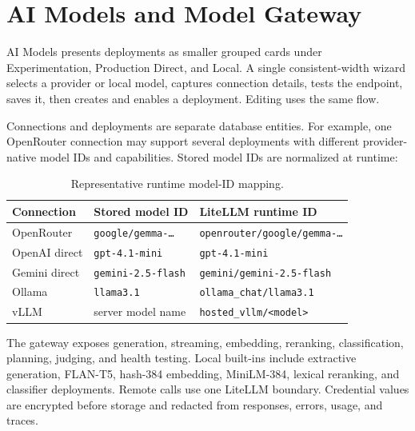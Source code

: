 
\section{AI Models and Model Gateway}

AI Models presents deployments as smaller grouped cards under Experimentation,
Production Direct, and Local. A single consistent-width wizard selects a
provider or local model, captures connection details, tests the endpoint, saves
it, then creates and enables a deployment. Editing uses the same flow.

Connections and deployments are separate database entities. For example, one
OpenRouter connection may support several deployments with different
provider-native model IDs and capabilities. Stored model IDs are normalized at
runtime:

\begin{table}[H]
  \centering
  \caption{Representative runtime model-ID mapping.}
  \label{tab:model-id-mapping}
  \begin{tabularx}{\textwidth}{p{}p{}X}
    \toprule
    Connection & Stored model ID & LiteLLM runtime ID\\
    \midrule
    OpenRouter & \texttt{google/gemma-\ldots} & \texttt{openrouter/google/gemma-\ldots}\\
    OpenAI direct & \texttt{gpt-4.1-mini} & \texttt{gpt-4.1-mini}\\
    Gemini direct & \texttt{gemini-2.5-flash} & \texttt{gemini/gemini-2.5-flash}\\
    Ollama & \texttt{llama3.1} & \texttt{ollama\_chat/llama3.1}\\
    vLLM & server model name & \texttt{hosted\_vllm/<model>}\\
    \bottomrule
  \end{tabularx}
\end{table}

The gateway exposes generation, streaming, embedding, reranking,
classification, planning, judging, and health testing. Local built-ins include
extractive generation, FLAN-T5, hash-384 embedding, MiniLM-384, lexical
reranking, and classifier deployments. Remote calls use one LiteLLM boundary.
Credential values are encrypted before storage and redacted from responses,
errors, usage, and traces.


